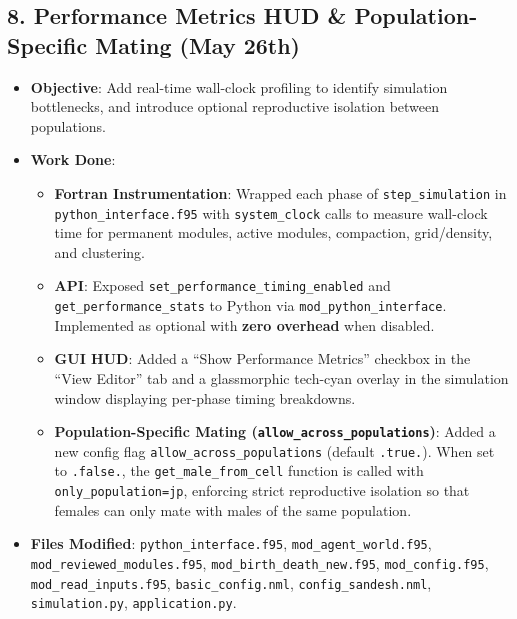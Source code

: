 \subsection{8. Performance Metrics HUD \& Population-Specific Mating (May 26th)}
\begin{itemize}
\item \textbf{Objective}: Add real-time wall-clock profiling to identify simulation bottlenecks, and introduce optional reproductive isolation between populations.
\item \textbf{Work Done}:
\begin{itemize}
\item \textbf{Fortran Instrumentation}: Wrapped each phase of \texttt{step\_simulation} in \texttt{python\_interface.f95} with \texttt{system\_clock} calls to measure wall-clock time for permanent modules, active modules, compaction, grid/density, and clustering.
\item \textbf{API}: Exposed \texttt{set\_performance\_timing\_enabled} and \texttt{get\_performance\_stats} to Python via \texttt{mod\_python\_interface}. Implemented as optional with \textbf{zero overhead} when disabled.
\item \textbf{GUI HUD}: Added a ``Show Performance Metrics'' checkbox in the ``View Editor'' tab and a glassmorphic tech-cyan overlay in the simulation window displaying per-phase timing breakdowns.
\item \textbf{Population-Specific Mating (\texttt{allow\_across\_populations})}: Added a new config flag \texttt{allow\_across\_populations} (default \texttt{.true.}). When set to \texttt{.false.}, the \texttt{get\_male\_from\_cell} function is called with \texttt{only\_population=jp}, enforcing strict reproductive isolation so that females can only mate with males of the same population.
\end{itemize}
\item \textbf{Files Modified}: \texttt{python\_interface.f95}, \texttt{mod\_agent\_world.f95}, \texttt{mod\_reviewed\_modules.f95}, \texttt{mod\_birth\_death\_new.f95}, \texttt{mod\_config.f95}, \texttt{mod\_read\_inputs.f95}, \texttt{basic\_config.nml}, \texttt{config\_sandesh.nml}, \texttt{simulation.py}, \texttt{application.py}.
\end{itemize}


